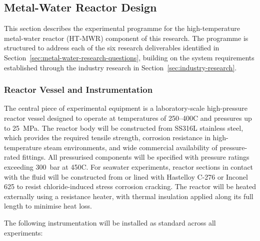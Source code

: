 \documentclass[12pt]{article}
\begin{document}
\break

\subsection{Metal-Water Reactor Design}
\label{subsec:reactor-methodology}

This section describes the experimental programme for the high-temperature 
metal-water reactor (HT-MWR) component of this research. The programme is 
structured to address each of the six research deliverables identified in 
Section~\ref{sec:metal-water-research-questions}, building on the system 
requirements established through the industry research in 
Section~\ref{sec:industry-research}.

\subsubsection*{Reactor Vessel and Instrumentation}

The central piece of experimental equipment is a laboratory-scale high-pressure 
reactor vessel designed to operate at temperatures of 250--400\textdegree C and 
pressures up to 25~MPa. The reactor body will be constructed from SS316L stainless 
steel, which provides the required tensile strength, corrosion resistance in 
high-temperature steam environments, and wide commercial availability of 
pressure-rated fittings. All pressurised components will be specified with pressure 
ratings exceeding 300~bar at 450\textdegree C. For seawater experiments, reactor 
sections in contact with the fluid will be constructed from or lined with Hastelloy 
C-276 or Inconel 625 to resist chloride-induced stress corrosion cracking. The 
reactor will be heated externally using a resistance heater, with thermal insulation 
applied along its full length to minimise heat loss.

The following instrumentation will be installed as standard across all experiments:
\end{document}
